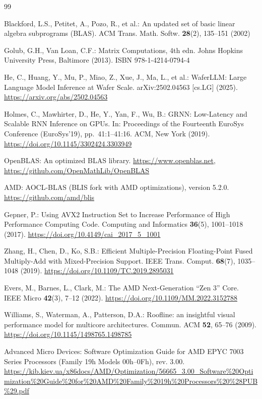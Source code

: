 \documentclass[runningheads]{llncs}
\begin{document}
\begin{thebibliography}{99}

Blackford, L.S., Petitet, A., Pozo, R., et al.:
An updated set of basic linear algebra subprograms (BLAS).
ACM Trans. Math. Softw. \textbf{28}(2), 135--151 (2002)

Golub, G.H., Van Loan, C.F.:
Matrix Computations, 4th edn.
Johns Hopkins University Press, Baltimore (2013).
ISBN 978-1-4214-0794-4

He, C., Huang, Y., Mu, P., Miao, Z., Xue, J., Ma, L., et al.:
WaferLLM: Large Language Model Inference at Wafer Scale.
arXiv:2502.04563 [cs.LG] (2025).
\url{https://arxiv.org/abs/2502.04563}

Holmes, C., Mawhirter, D., He, Y., Yan, F., Wu, B.:
GRNN: Low-Latency and Scalable RNN Inference on GPUs.
In: Proceedings of the Fourteenth EuroSys Conference (EuroSys'19),
pp.~41:1--41:16. ACM, New York (2019).
\url{https://doi.org/10.1145/3302424.3303949}

OpenBLAS: An optimized BLAS library.
\url{https://www.openblas.net},
\url{https://github.com/OpenMathLib/OpenBLAS}

AMD: AOCL-BLAS (BLIS fork with AMD optimizations), version 5.2.0.
\url{https://github.com/amd/blis}

Gepner, P.:
Using AVX2 Instruction Set to Increase Performance of High Performance Computing Code.
Computing and Informatics \textbf{36}(5), 1001--1018 (2017).
\url{https://doi.org/10.4149/cai_2017_5_1001}

Zhang, H., Chen, D., Ko, S.B.:
Efficient Multiple-Precision Floating-Point Fused Multiply-Add with Mixed-Precision Support.
IEEE Trans. Comput. \textbf{68}(7), 1035--1048 (2019).
\url{https://doi.org/10.1109/TC.2019.2895031}

Evers, M., Barnes, L., Clark, M.:
The AMD Next-Generation ``Zen 3'' Core.
IEEE Micro \textbf{42}(3), 7--12 (2022).
\url{https://doi.org/10.1109/MM.2022.3152788}

Williams, S., Waterman, A., Patterson, D.A.:
Roofline: an insightful visual performance model for multicore architectures.
Commun. ACM \textbf{52}, 65--76 (2009).
\url{https://doi.org/10.1145/1498765.1498785}

Advanced Micro Devices:
Software Optimization Guide for AMD EPYC\texttrademark{} 7003 Series Processors
(Family 19h Models 00h--0Fh), rev. 3.00.
\url{https://kib.kiev.ua/x86docs/AMD/Optimization/56665_3.00_Software\%20Optimization\%20Guide\%20for\%20AMD\%20Family\%2019h\%20Processors\%20\%28PUB\%29.pdf}


\end{thebibliography}
\end{document}
